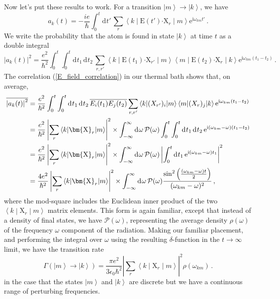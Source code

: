 \documentclass{article}
\theoremstyle{plain}\theoremheaderfont{\normalfont\itshape}\theorembodyfont{\rmfamily}\theoremseparator{.}\newtheorem*{rem}{Remark}\newtheorem*{ex}{Example}\newtheorem*{proof}{Proof}\newtheorem*{altp}{Alternative proof}
\theoremstyle{plain}\theoremheaderfont{\normalfont\bfseries}\theorembodyfont{\rmfamily}\theoremseparator{.}\newtheorem{thm}{Theorem}[section]\newtheorem{lem}[thm]{Lemma}\newtheorem{prop}[thm]{Proposition}\newtheorem*{cor}{Corollary}\newtheorem{defn}[thm]{Definition}\newtheorem{clm}[thm]{Claim}\newtheorem{clminproof}{Claim}
\theoremstyle{break}\theoremheaderfont{\normalfont\itshape}\theorembodyfont{\rmfamily}\theoremseparator{.\medskip}\newtheorem*{proofskip}{Proof}\newtheorem*{exs}{Examples}\newtheorem*{rems}{Remarks}
\theoremstyle{break}\theoremheaderfont{\normalfont\bfseries}\theorembodyfont{\rmfamily}\theoremseparator{.\medskip}\newtheorem{lemskip}[thm]{Lemma}\newtheorem{defnskip}[thm]{Definition}\newtheorem{propskip}[thm]{Proposition}\newtheorem{thmskip}[thm]{Theorem}
\numberwithin{equation}{section}
\newcommand{\ii}{\mathrm{i}}
\newcommand{\ee}{\mathrm{e}}
\newcommand{\dd}[2][]{\mathrm{d}^{#1} #2\,}
\newcommand{\ket}[1]{\left| #1 \right\rangle}
\newcommand{\mel}[3]{\left\langle #1 \middle| #2 \middle| #3 \right\rangle}
\newcommand{\vb}[1]{\bm{\mathrm{#1}}}
\newcommand{\vdot}{\bm{\cdot}}
\newcommand{\abs}[1]{\left| #1 \right|}
\begin{document}
    Now let's put these results to work. For a transition \(\ket{m}\to\ket{k}\), we have
    \begin{equation}
        a_k(t)=-\frac{ie}{\hbar}\int_{0}^{t}\dd{t'}\sum_{r}\mel{k}{\vb{E}(t')\vdot\vb{X}_r}{m}\ee^{\ii \omega_{km}t'}\,.
    \end{equation}
    We write the probability that the atom is found in state \(\ket{k}\) at time \(t\) as a double integral
    \begin{equation}
        \abs{a_k(t)}^2=\frac{e^2}{\hbar^2}\int_{0}^{t}\int_{0}^{t}\dd{t_1}\dd{t_2}\sum_{r,r'}\mel{k}{\vb{E}(t_1)\vdot\vb{X}_{r'}}{m}\mel{m}{\vb{E}(t_2)\vdot\vb{X}_{r}}{k}\ee^{\ii \omega_{km}(t_1-t_2)}\,.
    \end{equation}
    The correlation (\ref{E_field_correlation}) in our thermal bath shows that, on average,
    \begin{align}
        \overline{\abs{a_k(t)}^2}&=\frac{e^2}{\hbar^2}\int_{0}^{t}\int_{0}^{t}\dd{t_1}\dd{t_2}\overline{E_i(t_1)E_j(t_2)}\sum_{r,r'}\mel{k}{(X_{r'})_i}{m}\mel{m}{(X_r)_j}{k}\ee^{\ii \omega_{km}(t_1-t_2)}\notag\\
        &=\frac{e^2}{\hbar^2}\abs{\sum_r\mel{k}{\vb{X}_r}{m}}^2\times\int_{-\infty}^{\infty}\dd{\omega}\mathcal{P}(\omega)\int_{0}^{t}\int_{0}^{t}\dd{t_1}\dd{t_2}\ee^{\ii (\omega_{km}-\omega)(t_1-t_2)}\notag\\
        &=\frac{e^2}{\hbar^2}\abs{\sum_r\mel{k}{\vb{X}_r}{m}}^2\times\int_{-\infty}^{\infty}\dd{\omega}\mathcal{P}(\omega)\abs{\int_{0}^{t}\dd{t_1}\ee^{\ii (\omega_{km}-\omega)t_1}}^2\notag\\
        &=\frac{4e^2}{\hbar^2}\abs{\sum_r\mel{k}{\vb{X}_r}{m}}^2\times\int_{-\infty}^{\infty}\dd{\omega}\mathcal{P}(\omega)\frac{\sin^2\left(\frac{(\omega_{km}-\omega)t}{2}\right)}{(\omega_{km}-\omega)^2}\,,
    \end{align}
    where the mod-square includes the Euclidean inner product of the two \(\mel{k}{\vb{X}_r}{m}\) matrix elements. This form is again familiar, except that instead of a density of final states, we have \(\mathcal{P}(\omega)\), representing the average density \(\rho(\omega)\) of the frequency \(\omega\) component of the radiation. Making our familiar placement, and performing the integral over \(\omega\) using the resulting \(\delta\)-function in the \(t\to\infty\) limit, we have the transition rate
    \begin{equation}\label{atom_transition_rate}
        \Gamma(\ket{m}\to\ket{k})=\frac{\pi e^2}{3\epsilon_0\hbar^2}\abs{\sum_r \mel{k}{\vb{X}_r}{m}}^2\rho(\omega_{km})\,.
    \end{equation}
    in the case that the states \(\ket{m}\) and \(\ket{k}\) are discrete but we have a continuous range of perturbing frequencies.
\end{document}
